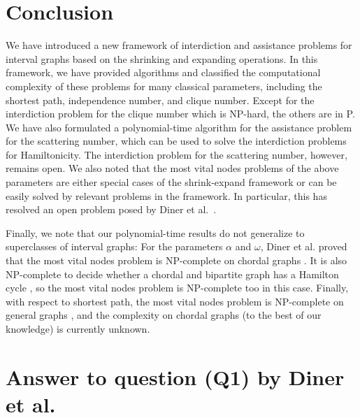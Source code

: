

\section{Conclusion}
We have introduced a new framework of interdiction and assistance problems for interval graphs based on the shrinking and expanding operations.
In this framework, we have provided algorithms and classified the computational complexity of these problems for many classical parameters, including the shortest path, independence number, and clique number.
Except for the interdiction problem for the clique number which is NP-hard, the others are in P.
We have also formulated a polynomial-time algorithm for the assistance problem for the scattering number, which can be used to solve the interdiction problems for Hamiltonicity.
The interdiction problem for the scattering number, however, remains open.
We also noted that the most vital nodes problems of the above parameters are either special cases of the shrink-expand framework or can be easily solved by relevant problems in the framework. 
In particular, this has resolved an open problem posed by Diner et al.~\cite[(Q2)]{diner2018contractionDeletionBlockers}.

Finally, we note that our polynomial-time results do not generalize to superclasses of interval graphs: For the parameters $\alpha$ and $\omega$, Diner et al. proved that the most vital nodes problem is NP-complete on chordal graphs \cite{diner2018contractionDeletionBlockers}. It is also NP-complete to decide whether a chordal and bipartite graph has a Hamilton cycle \cite{muller1996hamiltonian}, so the most vital nodes problem is NP-complete too in this case. Finally, with respect to shortest path, the most vital nodes problem is NP-complete on general graphs \cite{complexityOfFindingMostVitalNodesShortestPath}, and the complexity on chordal graphs (to the best of our knowledge) is currently unknown. 

\section{Answer to question (Q1) by Diner et al.\cite{diner2018contractionDeletionBlockers}}
\label{app:contraction}

